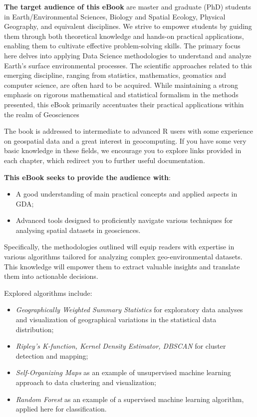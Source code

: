 \documentclass[
]{book}
\providecommand{\tightlist}{%
  \setlength{\itemsep}{0pt}\setlength{\parskip}{0pt}}
\begin{document}
\textbf{The target audience of this eBook} are master and graduate (PhD) students in Earth/Environmental Sciences, Biology and Spatial Ecology, Physical Geography, and equivalent disciplines.
We strive to empower students by guiding them through both theoretical knowledge and hands-on practical applications, enabling them to cultivate effective problem-solving skills.
The primary focus here delves into applying Data Science methodologies to understand and analyze Earth's surface environmental processes.
The scientific approaches related to this emerging discipline, ranging from statistics, mathematics, geomatics and computer science, are often hard to be acquired.
While maintaining a strong emphasis on rigorous mathematical and statistical formalism in the methods presented, this eBook primarily accentuates their practical applications within the realm of Geosciences

The book is addressed to intermediate to advanced R users with some experience on geospatial data and a great interest in geocomputing.
If you have some very basic knowledge in these fields, we encourage you to explore links provided in each chapter, which redirect you to further useful documentation.

\textbf{This eBook seeks to provide the audience with}:

\begin{itemize}
\tightlist
\item
  A good understanding of main practical concepts and applied aspects in GDA;
\item
  Advanced tools designed to proficiently navigate various techniques for analysing spatial datasets in geosciences.
\end{itemize}

Specifically, the methodologies outlined will equip readers with expertise in various algorithms tailored for analyzing complex geo-environmental datasets.
This knowledge will empower them to extract valuable insights and translate them into actionable decisions.

Explored algorithms include:

\begin{itemize}
\tightlist
\item
  \emph{Geographically Weighted Summary Statistics} for exploratory data analyses and visualization of geographical variations in the statistical data distribution;
\item
  \emph{Ripley's K-function, Kernel Density Estimator, DBSCAN} for cluster detection and mapping;
\item
  \emph{Self-Organizing Maps} as an example of unsupervised machine learning approach to data clustering and visualization;
\item
  \emph{Random Forest} as an example of a supervised machine learning algorithm, applied here for classification.
\end{itemize}
\end{document}
